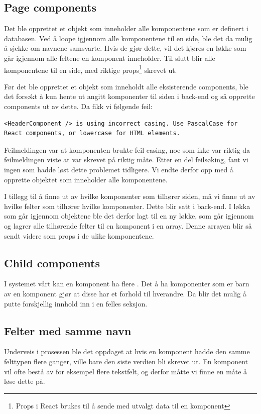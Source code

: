 \subsection{Page components}

Det ble opprettet et objekt som inneholder alle komponentene som er definert i databasen. Ved å loope igjennom alle komponentene til en side, ble det da mulig å sjekke om navnene samsvarte. Hvis de gjør dette, vil det kjøres en løkke som går igjennom alle feltene en komponent inneholder. Til slutt blir alle komponentene til en side, med riktige props\footnote{Props i React brukes til å sende med utvalgt data til en komponent} skrevet ut.  

Før det ble opprettet et objekt som inneholdt alle eksisterende components, ble det forsøkt å kun hente ut angitt komponenter til siden i back-end og så opprette components ut av dette. Da fikk vi følgende feil:
\begin{lstlisting}
<HeaderComponent /> is using incorrect casing. Use PascalCase for React components, or lowercase for HTML elements.
\end{lstlisting}

Feilmeldingen var at komponenten brukte feil casing, noe som ikke var riktig da feilmeldingen viste at  var skrevet på riktig måte. Etter en del feilsøking, fant vi ingen som hadde løst dette problemet tidligere. Vi endte derfor opp med å opprette objektet som inneholder alle komponentene. 

I tillegg til å finne ut av hvilke komponenter som tilhører siden, må vi finne ut av hvilke felter som tilhører hvilke komponenter. Dette blir satt i back-end. I løkka som går igjennom objektene ble det derfor lagt til en ny løkke, som går igjennom og lagrer alle tilhørende felter til en komponent i en array. Denne arrayen blir så sendt videre som props i de ulike komponentene.

\subsection{Child components}
I systemet vårt kan en komponent ha flere . Det å ha komponenter som er barn av en komponent gjør at disse har et forhold til hverandre. Da blir det mulig å putte forskjellig innhold inn i en felles seksjon.

\subsection{Felter med samme navn}
Underveis i prosessen ble det oppdaget at hvis en komponent hadde den samme felttypen flere ganger, ville bare den siste verdien bli skrevet ut. En komponent vil ofte bestå av for eksempel flere tekstfelt, og derfor måtte vi finne en måte å løse dette på.

